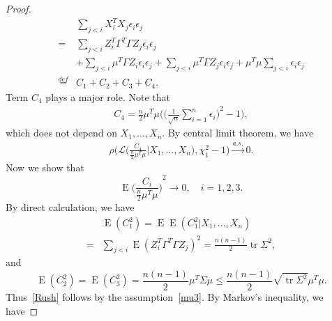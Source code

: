 \documentclass[review]{elsarticle}
\DeclareMathOperator{\mytr}{tr}
\DeclareMathOperator{\myE}{E}
\theoremstyle{plain}
\theoremstyle{definition}
\theoremstyle{remark}
\begin{document}
\begin{proof}
    \begin{equation*}
        \begin{aligned}
            &\sum_{j<i} X_i^T X_j \epsilon_i\epsilon_j\\
            =&
            \sum_{j<i} Z_i^T \Gamma^T \Gamma Z_j \epsilon_i\epsilon_j\\
            &+
            \sum_{j<i} \mu^T \Gamma Z_i \epsilon_i\epsilon_j
            +\sum_{j<i} \mu^T \Gamma Z_j \epsilon_i\epsilon_j+
            \mu^T \mu \sum_{j<i} \epsilon_i\epsilon_j\\
            \overset{def}{=}&C_1+C_2+C_3+C_4.
        \end{aligned}
    \end{equation*}
Term $C_4$ plays a major role. Note that
    \begin{equation*}
        \begin{aligned}
            C_4=\frac{n}{2}\mu^T \mu\Big({\Big(\frac{1}{\sqrt{n}}\sum_{i=1}^n \epsilon_i\Big)}^2-1\Big),
        \end{aligned}
    \end{equation*}
    which does not depend on $X_1,\ldots,X_n$.
By central limit theorem, we have
    \begin{equation}\label{Rush2}
        \begin{aligned}
            \rho\Big(\mathcal{L}\Big(\frac{C_4}{\frac{n}{2}\mu^T \mu}\Big| X_1,\ldots,X_n\Big),\chi^2_1-1\Big)\xrightarrow{a.s.} 0.
        \end{aligned}
    \end{equation}
Now we show that
    \begin{equation}\label{Rush}
    \myE{\Big(\frac{C_i}{\frac{n}{2}\mu^T\mu}\Big)}^2\to 0,
    \quad i=1,2,3.
    \end{equation}
    By direct calculation, we have
    \begin{equation*}
    \begin{aligned}
    &\myE(C_1^2)=\myE\myE(C_1^2|X_1,\ldots,X_n)\\
    =&\sum_{j<i}\myE{(Z_i^T \Gamma^T \Gamma Z_j)}^2=\frac{n(n-1)}{2}\mytr \Sigma^2,
    \end{aligned}
\end{equation*}
    and
    \begin{equation*}
    \myE(C_2^2)=\myE(C_3^2)=\frac{n(n-1)}{2}\mu^T \Sigma \mu\leq \frac{n(n-1)}{2}\sqrt{\mytr \Sigma^2}\mu^T\mu.
    \end{equation*}
    Thus~\eqref{Rush} follows by the assumption~\eqref{mu3}. By Markov's inequality, we have

\end{proof}
\end{document}
